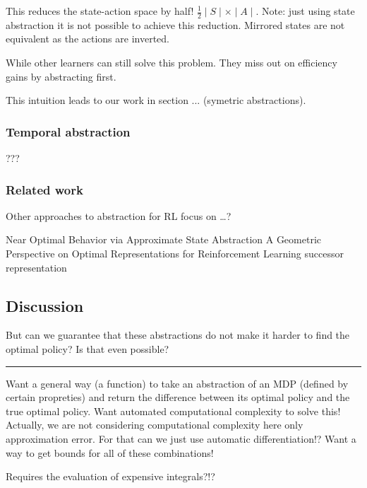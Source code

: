 This reduces the state-action space by half!
\(\frac{1}{2}\mid S \mid \times \mid A \mid\). Note: just using state
abstraction it is not possible to achieve this reduction. Mirrored
states are not equivalent as the actions are inverted.

While other learners can still solve this problem. They miss out on
efficiency gains by abstracting first.

This intuition leads to our work in section ... (symetric abstractions).

\subsubsection{Temporal abstraction}

???


\hypertarget{related-work}{%
\subsubsection{Related work}\label{related-work}}

Other approaches to abstraction for RL focus on \ldots{}?

Near Optimal Behavior via Approximate State Abstraction \cite{Abel2017}
A Geometric Perspective on Optimal Representations for Reinforcement Learning \cite{Bellemare2019b}
successor representation

\hypertarget{discussion}{%
\subsection{Discussion}\label{discussion}}

But can we guarantee that these abstractions do not make it harder to
find the optimal policy? Is that even possible?

\begin{center}\rule{0.5\linewidth}{\linethickness}\end{center}

Want a general way (a function) to take an abstraction of an MDP
(defined by certain propreties) and return the difference between its
optimal policy and the true optimal policy. Want automated computational
complexity to solve this! Actually, we are not considering computational
complexity here only approximation error. For that can we just use
automatic differentiation!? Want a way to get bounds for all of these
combinations!

Requires the evaluation of expensive integrals?!?
